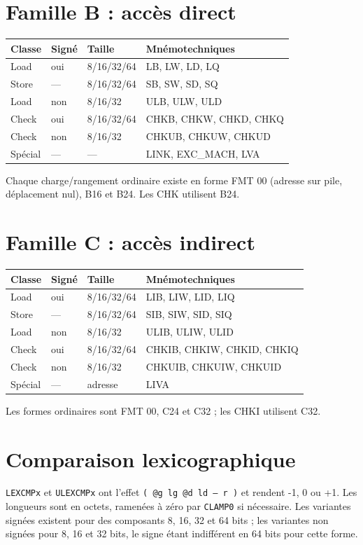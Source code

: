 \documentclass[10pt,a4paper,twoside,openany]{book}
\newcommand{\stack}[1]{\texttt{#1}}
\begin{document}
\section{Famille B : accès direct}
\begin{center}
\begin{tabularx}{\linewidth}{@{}l l l X@{}}
\toprule Classe & Signé & Taille & Mnémotechniques\\ \midrule
Load & oui & 8/16/32/64 & LB, LW, LD, LQ\\
Store & --- & 8/16/32/64 & SB, SW, SD, SQ\\
Load & non & 8/16/32 & ULB, ULW, ULD\\
Check & oui & 8/16/32/64 & CHKB, CHKW, CHKD, CHKQ\\
Check & non & 8/16/32 & CHKUB, CHKUW, CHKUD\\
Spécial & --- & --- & LINK, EXC\_MACH, LVA\\
\bottomrule
\end{tabularx}
\end{center}
Chaque charge/rangement ordinaire existe en forme FMT 00 (adresse sur pile, déplacement nul), B16 et B24. Les CHK utilisent B24.

\section{Famille C : accès indirect}
\begin{center}
\begin{tabularx}{\linewidth}{@{}l l l X@{}}
\toprule Classe & Signé & Taille & Mnémotechniques\\ \midrule
Load & oui & 8/16/32/64 & LIB, LIW, LID, LIQ\\
Store & --- & 8/16/32/64 & SIB, SIW, SID, SIQ\\
Load & non & 8/16/32 & ULIB, ULIW, ULID\\
Check & oui & 8/16/32/64 & CHKIB, CHKIW, CHKID, CHKIQ\\
Check & non & 8/16/32 & CHKUIB, CHKUIW, CHKUID\\
Spécial & --- & adresse & LIVA\\
\bottomrule
\end{tabularx}
\end{center}
Les formes ordinaires sont FMT 00, C24 et C32 ; les CHKI utilisent C32.

\section{Comparaison lexicographique}
\texttt{LEXCMPx} et \texttt{ULEXCMPx} ont l'effet \stack{( @g lg @d ld -- r )} et rendent -1, 0 ou +1. Les longueurs sont en octets, ramenées à zéro par \texttt{CLAMP0} si nécessaire. Les variantes signées existent pour des composants 8, 16, 32 et 64 bits ; les variantes non signées pour 8, 16 et 32 bits, le signe étant indifférent en 64 bits pour cette forme.
\end{document}
